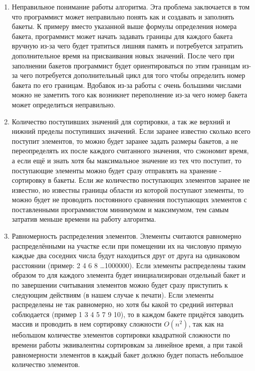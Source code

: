 \documentclass[12pt]{article}
\begin{document}
\begin{enumerate}
\item Неправильное понимание работы алгоритма. 
Эта проблема заключается в том что программист может неправильно понять как и создавать и заполнять бакеты.
К примеру вместо указанной выше формулы определения номера бакета, программист может начать задавать границы для каждого бакета вручную из-за чего будет тратиться лишняя память и потребуется затратить дополнительное время на присваивания новых значений.
После чего при заполнении бакетов программист будет ориентироваться по этим границам из-за чего потребуется дополнительный цикл для того чтобы определить номер бакета по его границам.
Вдобавок из-за работы с очень большими числами можно не заметить того как возникнет переполнение из-за чего номер бакета может определиться неправильно.
\item Количество поступивших значений для сортировки, а так же верхний и нижний пределы поступивших значений.
Если заранее известно сколько всего поступит элементов, то можно будет заранее задать размеры бакетов, а не переопределять их после каждого считанного значения, что сэкономит время, а если ещё и знать хотя бы максимальное значение из тех что поступит, то поступающие элементы можно будет сразу отправлять на хранение - сортировку в бакеты.
Если же количество поступающих элементов заранее не известно, но известны границы области из которой поступают элементы, то можно будет не проводить постоянного сравнения поступающих элементов с поставленными программистом минимумом и максимумом, тем самым затратив меньше времени на работу алгоритма.
\item Равномерность распределения элементов.
Элементы считаются равномерно распределёнными на участке если при помещении их на числовую прямую каждые два соседних числа будут находиться друг от друга на одинаковом расстоянии (пример: 2 4 6 8 \ldots 1000000).
Если элементы распределены таким образом то для каждого элемента будет инициализирован отдельный бакет и по завершении считывания элементов можно будет сразу приступить к следующим действиям (в нашем случае к печати).
Если элементы распределены не так равномерно, но хотя бы какой то средний интервал соблюдается (пример 1 3 4 5 7 9 10), то в каждом бакете придётся заводить массив и проводить в нем сортировку сложности $O(n^2)$, так как на небольшом количестве элементов сортировки квадратной сложности по времени работы эквивалентны сортировкам за линейное время, а при такой равномерности элементов в каждый бакет должно будет попасть небольшое количество элементов.

\end{enumerate}
\end{document}
